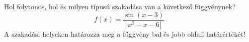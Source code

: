 \documentclass[11pt]{scrartcl}
\begin{document}
Hol folytonos, hol és milyen típusú szakadása van a következő függvénynek?
\[
	f(x) = \frac{\sin(x - 3)}{\left| x^2 - x - 6 \right|}
\]
A szakadási helyeken határozza meg a függvény bal és jobb oldali
határértékét!
\end{document}

